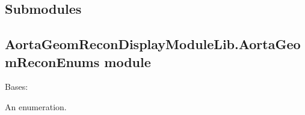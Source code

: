 \documentclass[letterpaper,10pt,english]{sphinxmanual}
\begin{document}
\subsection{Submodules}
\label{\detokenize{AortaGeomReconDisplayModuleLib:submodules}}

\subsection{AortaGeomReconDisplayModuleLib.AortaGeomReconEnums module}
\label{\detokenize{AortaGeomReconDisplayModuleLib:module-AortaGeomReconEnums}}\label{\detokenize{AortaGeomReconDisplayModuleLib:aortageomrecondisplaymodulelib-aortageomreconenums-module}}

\begin{fulllineitems}
\label{\detokenize{AortaGeomReconDisplayModuleLib:AortaGeomReconEnums.PixelValue}}
\sphinxAtStartPar
Bases: 

\sphinxAtStartPar
An enumeration.

\begin{fulllineitems}
\label{\detokenize{AortaGeomReconDisplayModuleLib:AortaGeomReconEnums.PixelValue.black_pixel}}
\end{fulllineitems}


\begin{fulllineitems}
\label{\detokenize{AortaGeomReconDisplayModuleLib:AortaGeomReconEnums.PixelValue.white_pixel}}
\end{fulllineitems}


\end{fulllineitems}
\end{document}
